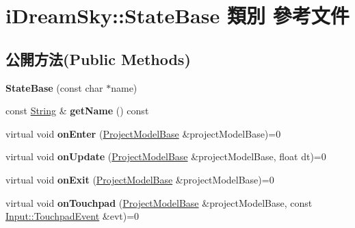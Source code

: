 \hypertarget{classi_dream_sky_1_1_state_base}{}\section{i\+Dream\+Sky\+:\+:State\+Base 類別 參考文件}
\label{classi_dream_sky_1_1_state_base}
\subsection*{公開方法(Public Methods)}
\begin{DoxyCompactItemize}
\item 
{\bfseries State\+Base} (const char $\ast$name)\hypertarget{classi_dream_sky_1_1_state_base_ac386528c4682c76aefd8f22116cd8aee}{}\label{classi_dream_sky_1_1_state_base_ac386528c4682c76aefd8f22116cd8aee}

\item 
const \hyperlink{class_i_dream_sky_1_1_string}{String} \& {\bfseries get\+Name} () const \hypertarget{classi_dream_sky_1_1_state_base_a3100edda4d41ef0497a9180b19d074d1}{}\label{classi_dream_sky_1_1_state_base_a3100edda4d41ef0497a9180b19d074d1}

\item 
virtual void {\bfseries on\+Enter} (\hyperlink{classi_dream_sky_1_1_project_model_base}{Project\+Model\+Base} \&project\+Model\+Base)=0\hypertarget{classi_dream_sky_1_1_state_base_aa9fb2383de83dca26202c1b6b5bd70dd}{}\label{classi_dream_sky_1_1_state_base_aa9fb2383de83dca26202c1b6b5bd70dd}

\item 
virtual void {\bfseries on\+Update} (\hyperlink{classi_dream_sky_1_1_project_model_base}{Project\+Model\+Base} \&project\+Model\+Base, float dt)=0\hypertarget{classi_dream_sky_1_1_state_base_a2287d32918b13cbe98232ab4ab06cf5b}{}\label{classi_dream_sky_1_1_state_base_a2287d32918b13cbe98232ab4ab06cf5b}

\item 
virtual void {\bfseries on\+Exit} (\hyperlink{classi_dream_sky_1_1_project_model_base}{Project\+Model\+Base} \&project\+Model\+Base)=0\hypertarget{classi_dream_sky_1_1_state_base_ae62857f38bec055c0694a30164a4f33b}{}\label{classi_dream_sky_1_1_state_base_ae62857f38bec055c0694a30164a4f33b}

\item 
virtual void {\bfseries on\+Touchpad} (\hyperlink{classi_dream_sky_1_1_project_model_base}{Project\+Model\+Base} \&project\+Model\+Base, const \hyperlink{class_i_dream_sky_1_1_input_1_1_touchpad_event}{Input\+::\+Touchpad\+Event} \&evt)=0\hypertarget{classi_dream_sky_1_1_state_base_adb6fe10cff60db6c2f8df40d27402c40}{}\label{classi_dream_sky_1_1_state_base_adb6fe10cff60db6c2f8df40d27402c40}


\end{DoxyCompactItemize}
